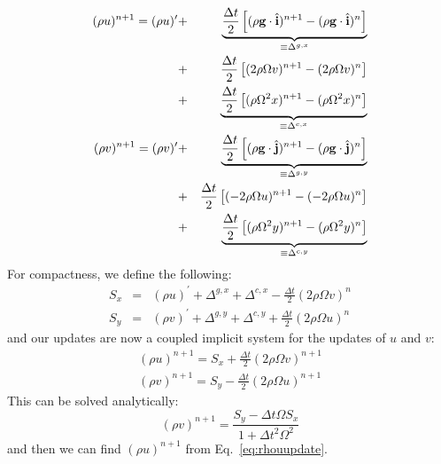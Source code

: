 \documentclass[12pt,preprint]{aastex}
\begin{document}
\begin{eqnarray}
(\rho u)^{n+1} = (\rho u)^\prime 
   &+& \underbrace{
      \frac{\Delta t}{2} \left [ (\rho {\bf g}\cdot \hat{\bf i})^{n+1}
                               - (\rho {\bf g}\cdot \hat{\bf i})^{n} \right ]
    }_{\equiv \Delta^{g,x}} \nonumber \\
   &+& \frac{\Delta t}{2} \left [ (2\rho \Omega v)^{n+1} 
                                - (2\rho \Omega v)^{n} \right ] \nonumber \\
   &+& \underbrace{
      \frac{\Delta t}{2} \left [ (\rho \Omega^2 x)^{n+1} 
                               - (\rho \Omega^2 x)^{n} \right ]
    }_{\equiv \Delta^{c,x}} \\
%
(\rho v)^{n+1} = (\rho v)^\prime 
   &+& \underbrace{
      \frac{\Delta t}{2} \left [ (\rho {\bf g}\cdot \hat{\bf j})^{n+1}
                               - (\rho {\bf g}\cdot \hat{\bf j})^{n} \right ]
    }_{\equiv \Delta^{g,y}} \nonumber \\
   &+& \frac{\Delta t}{2} \left [ (-2\rho \Omega u)^{n+1} 
                                - (-2\rho \Omega u)^{n} \right ] \nonumber \\
   &+& \underbrace{
      \frac{\Delta t}{2} \left [ (\rho \Omega^2 y)^{n+1} 
                               - (\rho \Omega^2 y)^{n} \right ]
    }_{\equiv \Delta^{c,y}} \\
\end{eqnarray}
For compactness, we define the following:
\begin{eqnarray}
S_x &=& (\rho u)^\prime + \Delta^{g,x} + \Delta^{c,x} 
        - \frac{\Delta t}{2} (2 \rho \Omega v)^n \\
%
S_y &=& (\rho v)^\prime + \Delta^{g,y} + \Delta^{c,y} 
        + \frac{\Delta t}{2} (2 \rho \Omega u)^n 
\end{eqnarray}
and our updates are now a coupled implicit system for the updates of
$u$ and $v$:
\begin{eqnarray}
(\rho u)^{n+1} = S_x + \frac{\Delta t}{2}(2\rho \Omega v)^{n+1} \label{eq:rhouupdate}\\
(\rho v)^{n+1} = S_y - \frac{\Delta t}{2}(2\rho \Omega u)^{n+1} 
\end{eqnarray}
This can be solved analytically:
\begin{equation}
(\rho v)^{n+1} = \frac{S_y - \Delta t \Omega S_x}{1 + \Delta t^2 \Omega^2}
\end{equation}
and then we can find $(\rho u)^{n+1}$ from Eq.~\ref{eq:rhouupdate}.
\clearpage
\end{document}
